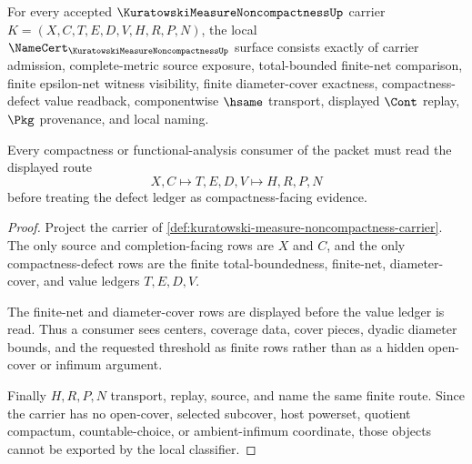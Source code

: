\begin{theorem}
\label{thm:kuratowski-measure-noncompactness-namecert-obligations}
For every accepted $\KuratowskiMeasureNoncompactnessUp$ carrier $K=(X,C,T,E,D,V,H,R,P,N)$, the local $\NameCert_{\KuratowskiMeasureNoncompactnessUp}$ surface consists exactly of carrier admission, complete-metric source exposure, total-bounded finite-net comparison, finite epsilon-net witness visibility, finite diameter-cover exactness, compactness-defect value readback, componentwise $\hsame$ transport, displayed $\Cont$ replay, $\Pkg$ provenance, and local naming.

Every compactness or functional-analysis consumer of the packet must read the displayed route
$$
X,C \longmapsto T,E,D,V \longmapsto H,R,P,N
$$
before treating the defect ledger as compactness-facing evidence.
\end{theorem}
\begin{proof}
Project the carrier of \autoref{def:kuratowski-measure-noncompactness-carrier}. The only source and completion-facing rows are $X$ and $C$, and the only compactness-defect rows are the finite total-boundedness, finite-net, diameter-cover, and value ledgers $T,E,D,V$.

The finite-net and diameter-cover rows are displayed before the value ledger is read. Thus a consumer sees centers, coverage data, cover pieces, dyadic diameter bounds, and the requested threshold as finite rows rather than as a hidden open-cover or infimum argument.

Finally $H,R,P,N$ transport, replay, source, and name the same finite route. Since the carrier has no open-cover, selected subcover, host powerset, quotient compactum, countable-choice, or ambient-infimum coordinate, those objects cannot be exported by the local classifier.
\end{proof}

